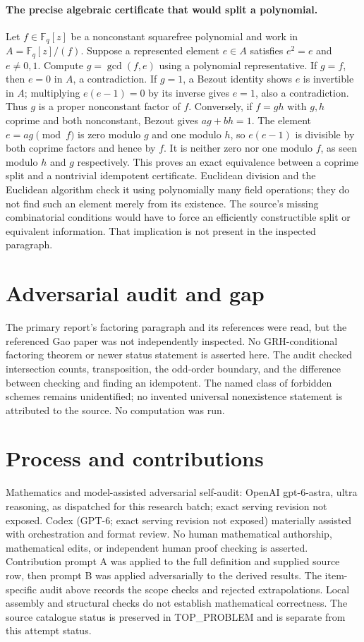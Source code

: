 \documentclass[11pt]{article}
\begin{document}
\paragraph{The precise algebraic certificate that would split a polynomial.}
Let $f\in\mathbb F_q[z]$ be a nonconstant squarefree polynomial and work
in $A=\mathbb F_q[z]/(f)$. Suppose a represented element $e\in A$ satisfies
$e^2=e$ and $e\ne0,1$. Compute $g=\gcd(f,e)$ using a polynomial
representative. If $g=f$, then $e=0$ in $A$, a contradiction.
If $g=1$, a Bezout identity shows $e$ is invertible in $A$; multiplying
$e(e-1)=0$ by its inverse gives $e=1$, also a contradiction.
Thus $g$ is a proper nonconstant factor of $f$.
Conversely, if $f=gh$ with $g,h$ coprime and both nonconstant, Bezout gives
$ag+bh=1$. The element $e=ag\pmod f$ is zero modulo $g$ and one modulo
$h$, so $e(e-1)$ is divisible by both coprime factors and hence by $f$.
It is neither zero nor one modulo $f$, as seen modulo $h$ and $g$ respectively.
This proves an exact equivalence between a coprime split and a nontrivial
idempotent certificate. Euclidean division and the Euclidean algorithm check
it using polynomially many field operations; they do not find such an
element merely from its existence. The source's missing combinatorial
conditions would have to force an efficiently constructible split or equivalent
information. That implication is not present in the inspected paragraph.

\section{Adversarial audit and gap}
The primary report's factoring paragraph and its references were read, but the
referenced Gao paper was not independently inspected. No GRH-conditional
factoring theorem or newer status statement is asserted here. The audit checked
intersection counts, transposition, the odd-order boundary, and the difference
between checking and finding an idempotent. The named class of forbidden
schemes remains unidentified; no invented universal nonexistence statement
is attributed to the source. No computation was run.

\section{Process and contributions}
Mathematics and model-assisted adversarial self-audit: OpenAI gpt-6-astra, ultra reasoning, as dispatched for this research batch; exact serving revision not exposed. Codex (GPT-6; exact serving revision not exposed) materially assisted with orchestration and format review. No human mathematical authorship, mathematical edits, or independent human proof checking is asserted.
Contribution prompt A was applied to the full definition and supplied source row, then prompt B was applied adversarially to the derived results. The item-specific audit above records the scope checks and rejected extrapolations. Local assembly and structural checks do not establish mathematical correctness. The source catalogue status is preserved in TOP\_PROBLEM and is separate from this attempt status.
\end{document}
